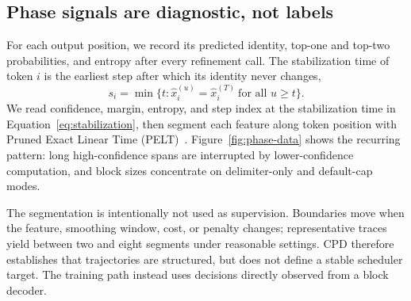 \documentclass{article}
\begin{document}
\subsection{Phase signals are diagnostic, not labels}
\label{sec:phase-signals}

For each output position, we record its predicted identity, top-one and top-two probabilities, and entropy after every refinement call. The stabilization time of token $i$ is the earliest step after which its identity never changes,
\begin{equation}
  s_i=\min\{t : \hat{x}_i^{(u)}=\hat{x}_i^{(T)}\ \text{for all }u\ge t\}.
  \label{eq:stabilization}
\end{equation}
We read confidence, margin, entropy, and step index at the stabilization time in Equation~\ref{eq:stabilization}, then segment each feature along token position with Pruned Exact Linear Time (PELT)~\citep{killick2012optimal}. Figure~\ref{fig:phase-data} shows the recurring pattern: long high-confidence spans are interrupted by lower-confidence computation, and block sizes concentrate on delimiter-only and default-cap modes.

The segmentation is intentionally not used as supervision. Boundaries move when the feature, smoothing window, cost, or penalty changes; representative traces yield between two and eight segments under reasonable settings. CPD therefore establishes that trajectories are structured, but does not define a stable scheduler target. The training path instead uses decisions directly observed from a block decoder.
\end{document}
